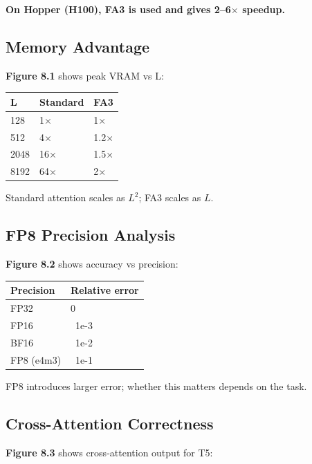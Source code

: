 \textbf{On Hopper (H100), FA3 is used and gives 2--6$\times$ speedup.}

\subsection{Memory Advantage}

\textbf{Figure 8.1} shows peak VRAM vs L:

\begin{table}[H]
\centering
\small
\begin{tabular}{lll}
\toprule
\textbf{L} & \textbf{Standard} & \textbf{FA3} \\
\midrule
128 & 1$\times$ & 1$\times$ \\
512 & 4$\times$ & 1.2$\times$ \\
2048 & 16$\times$ & 1.5$\times$ \\
8192 & 64$\times$ & 2$\times$ \\
\bottomrule
\end{tabular}
\end{table}

Standard attention scales as $L^2$; FA3 scales as $L$.

\subsection{FP8 Precision Analysis}

\textbf{Figure 8.2} shows accuracy vs precision:

\begin{table}[H]
\centering
\small
\begin{tabular}{ll}
\toprule
\textbf{Precision} & \textbf{Relative error} \\
\midrule
FP32 & 0 \\
FP16 & ~1e-3 \\
BF16 & ~1e-2 \\
FP8 (e4m3) & ~1e-1 \\
\bottomrule
\end{tabular}
\end{table}

FP8 introduces larger error; whether this matters depends on the task.

\subsection{Cross-Attention Correctness}

\textbf{Figure 8.3} shows cross-attention output for T5:

